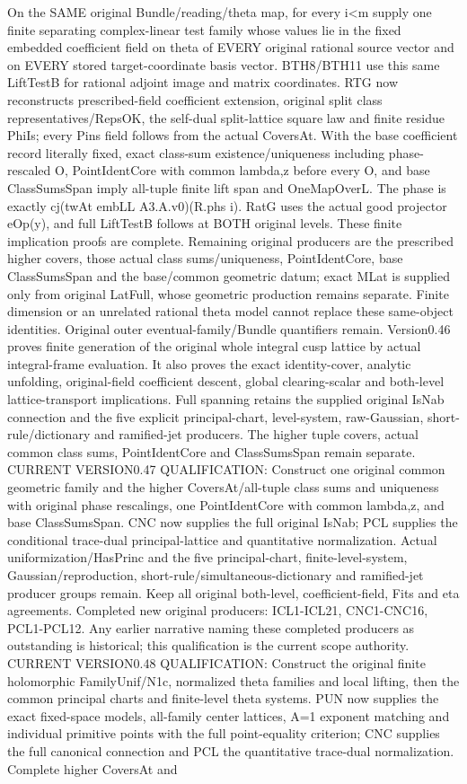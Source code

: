 On the SAME original Bundle/reading/theta map, for every i<m supply one finite separating complex-linear test family whose values lie in the fixed embedded coefficient field on theta of EVERY original rational source vector and on EVERY stored target-coordinate basis vector. BTH8/BTH11 use this same LiftTestB for rational adjoint image and matrix coordinates. RTG now reconstructs prescribed-field coefficient extension, original split class representatives/RepsOK, the self-dual split-lattice square law and finite residue PhiIs; every Pins field follows from the actual CoversAt. With the base coefficient record literally fixed, exact class-sum existence/uniqueness including phase-rescaled O, PointIdentCore with common lambda,z before every O, and base ClassSumsSpan imply all-tuple finite lift span and OneMapOverL. The phase is exactly cj(twAt embLL A3.A.v0)(R.phs i). RatG uses the actual good projector eOp(y), and full LiftTestB follows at BOTH original levels. These finite implication proofs are complete. Remaining original producers are the prescribed higher covers, those actual class sums/uniqueness, PointIdentCore, base ClassSumsSpan and the base/common geometric datum; exact MLat is supplied only from original LatFull, whose geometric production remains separate. Finite dimension or an unrelated rational theta model cannot replace these same-object identities. Original outer eventual-family/Bundle quantifiers remain. Version0.46 proves finite generation of the original whole integral cusp lattice by actual integral-frame evaluation. It also proves the exact identity-cover, analytic unfolding, original-field coefficient descent, global clearing-scalar and both-level lattice-transport implications. Full spanning retains the supplied original IsNab connection and the five explicit principal-chart, level-system, raw-Gaussian, short-rule/dictionary and ramified-jet producers. The higher tuple covers, actual common class sums, PointIdentCore and ClassSumsSpan remain separate. CURRENT VERSION0.47 QUALIFICATION: Construct one original common geometric family and the higher CoversAt/all-tuple class sums and uniqueness with original phase rescalings, one PointIdentCore with common lambda,z, and base ClassSumsSpan. CNC now supplies the full original IsNab; PCL supplies the conditional trace-dual principal-lattice and quantitative normalization. Actual uniformization/HasPrinc and the five principal-chart, finite-level-system, Gaussian/reproduction, short-rule/simultaneous-dictionary and ramified-jet producer groups remain. Keep all original both-level, coefficient-field, Fits and eta agreements. Completed new original producers: ICL1-ICL21, CNC1-CNC16, PCL1-PCL12. Any earlier narrative naming these completed producers as outstanding is historical; this qualification is the current scope authority. CURRENT VERSION0.48 QUALIFICATION: Construct the original finite holomorphic FamilyUnif/N1c, normalized theta families and local lifting, then the common principal charts and finite-level theta systems. PUN now supplies the exact fixed-space models, all-family center lattices, A=1 exponent matching and individual primitive points with the full point-equality criterion; CNC supplies the full canonical connection and PCL the quantitative trace-dual normalization. Complete higher CoversAt and 